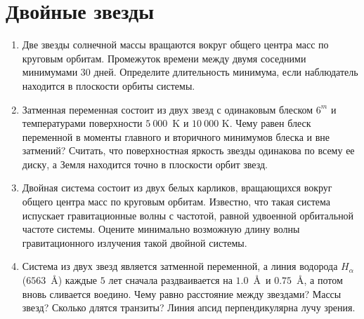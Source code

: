 \documentclass[12pt]{article}
\begin{document}
\section*{Двойные звезды}
\begin{enumerate}[resume]
    \item Две звезды солнечной массы вращаются вокруг общего центра масс по круговым орбитам. Промежуток времени между двумя соседними минимумами $30$ дней. Определите длительность минимума, если наблюдатель находится в плоскости орбиты системы.
    \item Затменная переменная состоит из двух звезд с одинаковым блеском $6^m$ и температурами
	поверхности $5~000$~K и $10~000$ K. Чему равен блеск переменной в моменты главного и вторичного минимумов блеска и вне затмений? Считать, что поверхностная яркость звезды одинакова по всему ее диску, а Земля находится точно в плоскости орбит звезд.
    \item Двойная система состоит из двух белых карликов, вращающихся вокруг общего центра масс по круговым орбитам. Известно, что такая система испускает гравитационные волны с частотой, равной удвоенной орбитальной частоте системы. Оцените минимально возможную длину волны гравитационного излучения такой двойной системы.
    \item Система из двух звезд является затменной переменной, а линия водорода $H_{\alpha}$ ($6563$~\AA) каждые $5$ лет сначала раздваивается на $1.0$~\AA~и $0.75$~\AA, а потом вновь сливается воедино. Чему равно расстояние между звездами? Массы звезд? Сколько длятся транзиты? Линия апсид перпендикулярна лучу зрения.
\end{enumerate}
\end{document}
